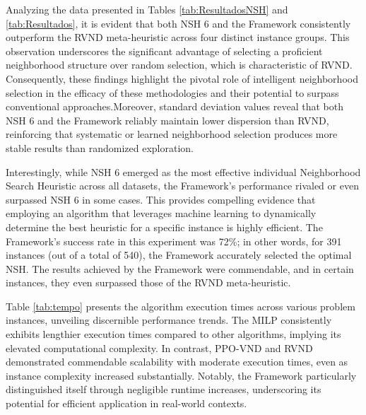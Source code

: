 \documentclass{article}
\begin{document}
Analyzing the data presented in Tables \ref{tab:ResultadosNSH} and \ref{tab:Resultados}, it is evident that both NSH 6 and the Framework consistently outperform the RVND meta-heuristic across four distinct instance groups. This observation underscores the significant advantage of selecting a proficient neighborhood structure over random selection, which is characteristic of RVND. Consequently, these findings highlight the pivotal role of intelligent neighborhood selection in the efficacy of these methodologies and their potential to surpass conventional approaches.Moreover, standard deviation values reveal that both NSH 6 and the Framework reliably maintain lower dispersion than RVND, reinforcing that systematic or learned neighborhood selection produces more stable results than randomized exploration.

Interestingly, while NSH 6 emerged as the most effective individual Neighborhood Search Heuristic across all datasets, the Framework's performance rivaled or even surpassed NSH 6 in some cases. This provides compelling evidence that employing an algorithm that leverages machine learning to dynamically determine the best heuristic for a specific instance is highly efficient. The Framework's success rate in this experiment was 72\%; in other words, for 391 instances (out of a total of 540), the Framework accurately selected the optimal NSH. The results achieved by the Framework were commendable, and in certain instances, they even surpassed those of the RVND meta-heuristic.

Table \ref{tab:tempo} presents the algorithm execution times across various problem instances, unveiling discernible performance trends. The MILP consistently exhibits lengthier execution times compared to other algorithms, implying its elevated computational complexity. In contrast, PPO-VND and RVND demonstrated commendable scalability with moderate execution times, even as instance complexity increased substantially. Notably, the Framework particularly distinguished itself through negligible runtime increases, underscoring its potential for efficient application in real-world contexts.
\end{document}

